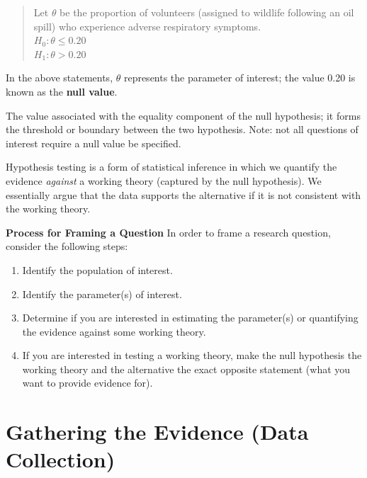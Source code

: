\documentclass[]{book}
\providecommand{\tightlist}{%
  \setlength{\itemsep}{0pt}\setlength{\parskip}{0pt}}
\theoremstyle{definition}
\theoremstyle{definition}
\theoremstyle{remark}
\let\BeginKnitrBlock\begin \let\EndKnitrBlock\end
\begin{document}
\begin{quote}
Let \(\theta\) be the proportion of volunteers (assigned to wildlife
following an oil spill) who experience adverse respiratory symptoms.\\
\(H_0: \theta \leq 0.20\)\\
\(H_1: \theta > 0.20\)
\end{quote}

In the above statements, \(\theta\) represents the parameter of
interest; the value 0.20 is known as the \textbf{null value}.

\BeginKnitrBlock{definition}[Null Value]
\protect\hypertarget{def:defn-null-value}{}{\label{def:defn-null-value}
{} }The value associated with the equality
component of the null hypothesis; it forms the threshold or boundary
between the two hypothesis. Note: not all questions of interest require
a null value be specified.
\EndKnitrBlock{definition}

\BeginKnitrBlock{rmdkeyidea}
Hypothesis testing is a form of statistical inference in which we
quantify the evidence \emph{against} a working theory (captured by the
null hypothesis). We essentially argue that the data supports the
alternative if it is not consistent with the working theory.
\EndKnitrBlock{rmdkeyidea}

\BeginKnitrBlock{rmdtip}
\textbf{Process for Framing a Question} In order to frame a research
question, consider the following steps:

\begin{enumerate}
\def\labelenumi{\arabic{enumi}.}
\tightlist
\item
  Identify the population of interest.
\item
  Identify the parameter(s) of interest.
\item
  Determine if you are interested in estimating the parameter(s) or
  quantifying the evidence against some working theory.
\item
  If you are interested in testing a working theory, make the null
  hypothesis the working theory and the alternative the exact opposite
  statement (what you want to provide evidence for).
\end{enumerate}
\EndKnitrBlock{rmdtip}

\chapter{Gathering the Evidence (Data Collection)}\label{Data}
\end{document}
